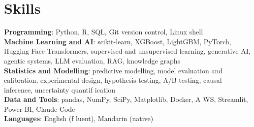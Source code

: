 \documentclass[letterpaper,11pt]{article}
\begin{document}
\section{\textbf{Skills}}
 \begin{itemize}[leftmargin=0.15in, label={}]
    \small{\item{
     \textbf{Programming}{: Python, R, SQL, Git version control, Linux shell} \\
     \textbf{Machine Learning and AI}{: scikit-learn, XGBoost, LightGBM, PyTorch, Hugging Face Transformers, supervised and unsupervised learning, generative AI, agentic systems, LLM evaluation, RAG, knowledge graphs} \\
     \textbf{Statistics and Modelling}{: predictive modelling, model evaluation and calibration, experimental design, hypothesis testing, A/B testing, causal inference, uncertainty quantif\kern0pt ication} \\
     \textbf{Data and Tools}{: pandas, NumPy, SciPy, Matplotlib, Docker, A\kern0pt WS, Streamlit, Power BI, Claude Code} \\
     \textbf{Languages}{: English (f\kern0pt luent), Mandarin (native)}}}

 \end{itemize}
\end{document}
